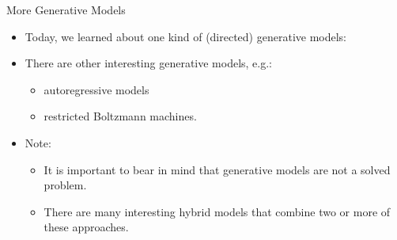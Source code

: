 \begin{frame} {More Generative Models}
  \begin{itemize}
   \vspace{8mm}
   \item Today, we learned about one kind of (directed) generative models:
   \item There are other interesting generative models, e.g.:
      \begin{itemize}
        \item autoregressive models
        \item restricted Boltzmann machines.
      \end{itemize}
    \item Note:
      \begin{itemize}
        \item It is important to bear in mind that generative models are not a solved problem.
        \item There are many interesting hybrid models that combine two or more of these approaches.
      \end{itemize}
  \end{itemize}
\end{frame}



